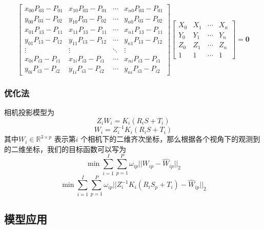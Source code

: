 \begin{equation}
    \left[ \begin{array}{cccc}
        x_{00}P_{03} - P_{01}  & x_{10}P_{03} - P_{01} & \cdots & x_{n0}P_{03} - P_{01} \\ 
        y_{00}P_{03} - P_{02}  & y_{10}P_{03} - P_{02} & \cdots & y_{n0}P_{03} - P_{02} \\
        x_{01}P_{13} - P_{11}  & x_{11}P_{13} - P_{11} & \cdots & x_{n1}P_{13} - P_{11} \\ 
        y_{01}P_{13} - P_{12}  & y_{11}P_{13} - P_{12} & \cdots & y_{n1}P_{13} - P_{12} \\
        \vdots & \vdots & \ddots & \vdots \\
        x_{0i}P_{i3} - P_{i1}  & x_{1i}P_{i3} - P_{i1} & \cdots & x_{ni}P_{i3} - P_{i1} \\ 
        y_{0i}P_{i3} - P_{i2}  & y_{1i}P_{i3} - P_{i2} & \cdots & y_{ni}P_{i3} - P_{i2}
    \end{array}\right] \left[ \begin{array}{cccc}
        X_0 & X_1 & \cdots & X_n \\
        Y_0 & Y_1 & \cdots & Y_n \\
        Z_0 & Z_1 & \cdots & Z_n \\
        1 & 1 & \cdots & 1
    \end{array}\right]  = \bm{0}
\end{equation}


\subsubsection{优化法}
相机投影模型为
\begin{equation}
    Z_i W_i = K_i(R_iS + T_i)
\end{equation}
\begin{equation}
W_i = Z_i^{-1}K_i(R_iS + T_i)    
\end{equation}
其中$W_i\in \mathbb{R}^{3\times p}$  表示第$i$ 个相机下的二维齐次坐标，那么根据各个视角下的观测到的二维坐标，我们的目标函数可以写为
\begin{equation}
    \min \sum^I_{i=1} \sum_{p=1}^P \omega_{ip}||W_{ip} - \hat W_{ip}||_2
\end{equation}
\begin{equation}
    \min \sum^I_{i=1} \sum_{p=1}^P \omega_{ip}||Z_i^{-1}K_i(R_iS_p + T_i) - \hat W_{ip}||_2  
\end{equation}

\subsection{模型应用}

